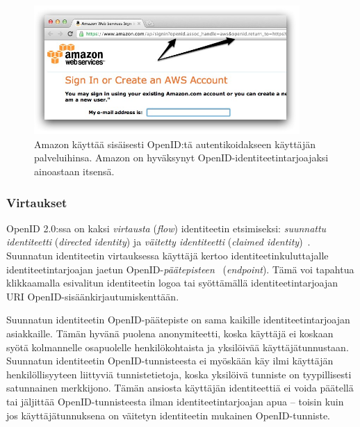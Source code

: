 \documentclass[finnish,gradu]{tktltiki}
\begin{document}
  \begin{figure}
    \centering
    \includegraphics[width=0.9\textwidth]{images/amazon_openid.jpg}
    \caption{Amazon käyttää sisäisesti OpenID:tä autentikoidakseen käyttäjän palveluihinsa. Amazon on hyväksynyt  OpenID-identiteetintarjoajaksi ainoastaan itsensä.}
    \label{fig:amazon_openid}
  \end{figure}


  \subsubsection{Virtaukset} %
  \label{ssub:openid_virtaukset}

  OpenID 2.0:ssa on kaksi \emph{virtausta} (\emph{flow}) identiteetin etsimiseksi: \emph{suunnattu identiteetti}  (\emph{directed identity}) ja \emph{väitetty identiteetti} (\emph{claimed identity})~\cite{hueniverse_openid_idps}. Suunnatun identiteetin virtauksessa käyttäjä kertoo identiteetinkuluttajalle identiteetintarjoajan jaetun OpenID-\emph{päätepisteen}~\cite{openid_discovery_recordon_2008} (\emph{endpoint}). Tämä voi tapahtua klikkaamalla esivalitun identiteetin logoa tai syöttämällä identiteetintarjoajan URI OpenID-sisäänkirjautumiskenttään.

  Suunnatun identiteetin OpenID-päätepiste on sama kaikille identiteetintarjoajan asiakkaille. Tämän hyvänä puolena anonymiteetti, koska käyttäjä ei koskaan syötä kolmannelle osapuolelle henkilökohtaista ja yksilöivää käyttäjätunnustaan. Suunnatun identiteetin OpenID-tunnisteesta ei myöskään käy ilmi käyttäjän henkilöllisyyteen liittyviä tunnistetietoja, koska yksilöivä tunniste on tyypillisesti satunnainen merkkijono. Tämän ansiosta käyttäjän identiteettiä ei voida päätellä tai jäljittää OpenID-tunnisteesta ilman identiteetintarjoajan apua -- toisin kuin jos käyttäjätunnuksena on väitetyn identiteetin mukainen OpenID-tunniste.
\end{document}
